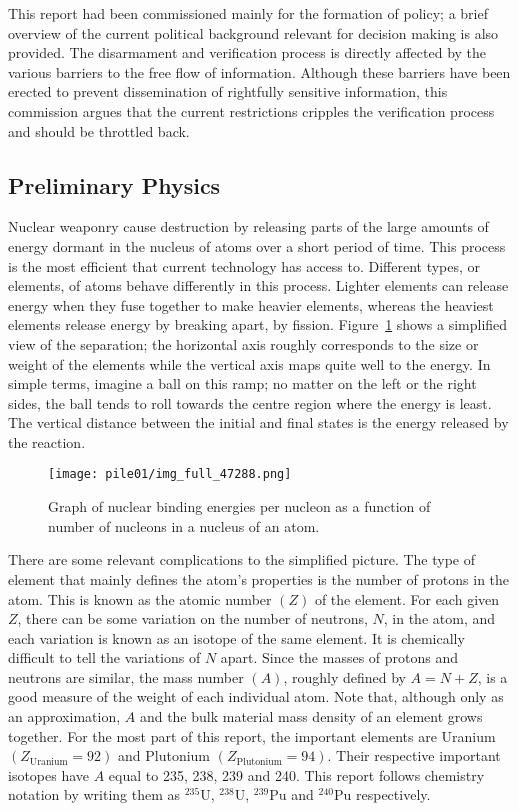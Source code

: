 \documentclass[twoside,titlepage,11pt,twocolumn,a4paper]{article}
\begin{document}
This report had been commissioned mainly for the formation of policy;
a brief overview of the current political background relevant for
decision making is also provided. The disarmament and verification
process is directly affected by the various barriers to the free flow
of information. Although these barriers have been erected to prevent
dissemination of rightfully sensitive information, this commission
argues that the current restrictions cripples the verification
process and should be throttled back. 

\subsection{Preliminary Physics}
Nuclear weaponry cause destruction by releasing parts of the large
amounts of energy dormant in the nucleus of atoms over a short period
of time. This process is the most efficient that current technology
has access to. Different types, or elements, of atoms behave
differently in this process. Lighter elements can release energy when
they fuse together to make heavier elements, whereas the heaviest
elements release energy by breaking apart, by
fission. Figure~\ref{nuclearBindingEnergyBowl} shows a simplified view
of the separation; the horizontal axis roughly corresponds to the size
or weight of the elements while the vertical axis maps quite well to
the energy. In simple terms, imagine a ball on this ramp; no matter on
the left or the right sides, the ball tends to roll towards the centre
region where the energy is least. The vertical distance between the
initial and final states is the energy released by the reaction.

\begin{figure}
  \texttt{[image: pile01/img\_full\_47288.png]}
  \caption{Graph of nuclear binding energies per nucleon as a function
    of number of nucleons in a nucleus of an
    atom. \citep{iopBindingE}}
  \label{nuclearBindingEnergyBowl}
\end{figure}

There are some relevant complications to the simplified picture. The
type of element that mainly defines the atom's properties is the
number of protons in the atom. This is known as the atomic number \(
\left ( Z \right ) \) of the element. For each given \(Z\), there can
be some variation on the number of neutrons, \(N\), in the atom, and
each variation is known as an isotope of the same element. It is
chemically difficult to tell the variations of \(N\) apart. Since the
masses of protons and neutrons are similar, the mass number \( \left (
A \right ) \), roughly defined by \(A=N+Z\), is a good measure of the
weight of each individual atom. Note that, although only as an
approximation, \(A\) and the bulk material mass density of an element
grows together. For the most part of this report, the important
elements are Uranium \( \left ( Z_{\textrm{Uranium}} = 92 \right ) \)
and Plutonium \( \left ( Z_{\textrm{Plutonium}} = 94 \right )
\). Their respective important isotopes have \(A\) equal to 235, 238,
239 and 240. This report follows chemistry notation by writing them as
\( \mathrm{^{235}U} \), \( \mathrm{^{238}U} \), \( \mathrm{^{239}Pu}
\) and \( \mathrm{^{240}Pu} \) respectively.
\end{document}
